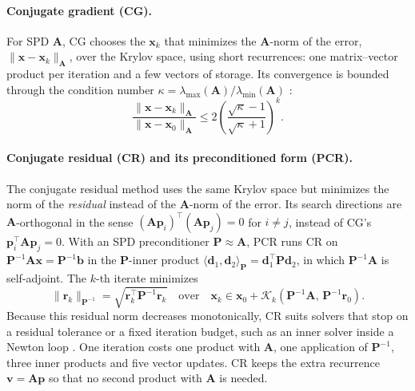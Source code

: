 \paragraph{Conjugate gradient (CG).}
For SPD $\mathbf{A}$, CG \citep{hestenes1952methods,wiki:cg} chooses the $\mathbf{x}_k$ that
minimizes the $\mathbf{A}$-norm of the error, $\|\mathbf{x} - \mathbf{x}_k\|_{\mathbf{A}}$, over the
Krylov space, using short recurrences: one matrix--vector product per
iteration and a few vectors of storage. Its convergence is bounded through the
condition number $\kappa = \lambda_{\max}(\mathbf{A})/\lambda_{\min}(\mathbf{A})$
\citep{saad2003iterative,trefethen1997numerical}:
\begin{equation}
  \frac{\|\mathbf{x} - \mathbf{x}_k\|_{\mathbf{A}}}{\|\mathbf{x} - \mathbf{x}_0\|_{\mathbf{A}}}
  \le 2 \left( \frac{\sqrt{\kappa} - 1}{\sqrt{\kappa} + 1} \right)^{k} .
  \label{eq:cg-bound}
\end{equation}

\paragraph{Conjugate residual (CR) and its preconditioned form (PCR).}
The conjugate residual method \citep{stiefel1955relaxationsmethoden,saad2003iterative}
uses the same Krylov space but minimizes the norm of the \emph{residual}
instead of the $\mathbf{A}$-norm of the error. Its search directions are
$\mathbf{A}$-orthogonal in the sense $(\mathbf{A}\mathbf{p}_i)^\top (\mathbf{A}\mathbf{p}_j) = 0$ for $i \ne j$,
instead of CG's $\mathbf{p}_i^\top \mathbf{A} \mathbf{p}_j = 0$. With an SPD preconditioner $\mathbf{P} \approx \mathbf{A}$, PCR runs CR on
$\mathbf{P}^{-1}\mathbf{A}\mathbf{x} = \mathbf{P}^{-1}\mathbf{b}$ in the $\mathbf{P}$-inner product
$\langle \mathbf{d}_1, \mathbf{d}_2 \rangle_{\mathbf{P}} = \mathbf{d}_1^\top \mathbf{P} \mathbf{d}_2$, in which
$\mathbf{P}^{-1}\mathbf{A}$ is self-adjoint. The $k$-th iterate minimizes
\begin{equation}
  \|\mathbf{r}_k\|_{\mathbf{P}^{-1}} = \sqrt{\mathbf{r}_k^\top \mathbf{P}^{-1} \mathbf{r}_k}
  \quad \text{over} \quad
  \mathbf{x}_k \in \mathbf{x}_0 + \mathcal{K}_k(\mathbf{P}^{-1}\mathbf{A},\, \mathbf{P}^{-1}\mathbf{r}_0) .
\end{equation}
Because this residual norm decreases monotonically, CR suits solvers that
stop on a residual tolerance or a fixed iteration budget, such as an
inner solver inside a Newton loop \citep{macklin2019nonsmooth}. One
iteration costs one product with $\mathbf{A}$, one application of $\mathbf{P}^{-1}$, three
inner products and five vector updates. CR keeps the extra recurrence
$\mathbf{v} = \mathbf{A}\mathbf{p}$ so that no second product with $\mathbf{A}$ is needed.

